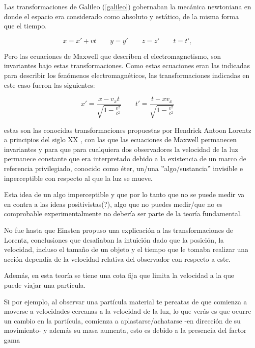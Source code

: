 \documentclass[11pt]{book}
\begin{document}
Las transformaciones de Galileo (\ref{galileo}) gobernaban la mecánica newtoniana en donde el espacio era considerado como absoluto y estático, de la misma forma que el tiempo.

\begin{equation}
 x=x'+vt \qquad y=y' \qquad z=z' \qquad t=t' ,
 \label{galileo}
\end{equation}

Pero las ecuaciones de Maxwell que describen el electromagnetismo, son invariantes bajo estas transformaciones. Como estas ecuaciones eran las indicadas para describir los fenómenos electromagnéticos, las transformaciones indicadas en este caso fueron las siguientes:

\begin{equation}
x'=\frac{x - v_x t}{\sqrt{1-\frac{v^2}{c^2}}} \qquad t'=\frac{t-xv_x}{\sqrt{1-\frac{v^2}{c^2}}}
\label{lorentz}
\end{equation}


estas son las conocidas transformaciones propuestas por Hendrick Antoon Lorentz a principios del siglo XX %
, con las que las ecuaciones de Maxwell permanecen invariantes y para que para cualquiera dos observadores la velocidad de la luz permanece constante que era interpretado debido a la existencia de un marco de referencia privilegiado, conocido como éter, un/una ''algo/sustancia'' invisible e inperceptible con respecto al que la luz se mueve.

Esta idea de un algo imperceptible y que por lo tanto que no se puede medir va en contra a las ideas positivistas(?), algo que no puedes medir/que no es comprobable experimentalmente no debería ser parte de la teoría fundamental.
 
No fue hasta que Einsten propuso una explicación a las transformaciones de Lorentz, conclusiones que desafiaban la intuición dado que  la posición, la velocidad, incluso el tamaño de un objeto y el tiempo que le tomaba realizar una acción dependía de la velocidad relativa del observador con respecto a este.

Además, en esta teoría se tiene una cota fija que limita la velocidad a la que puede viajar una partícula. 

Si por ejemplo, al observar una partícula material te percatas de que comienza a moverse a velocidades cercanas a la velocidad de la luz, lo que verás es que ocurre un cambio en la partícula, comienza a aplastarse/achatarse -en dirección de su movimiento- y además su masa aumenta, esto es debido a la presencia del factor gama 
\end{document}
